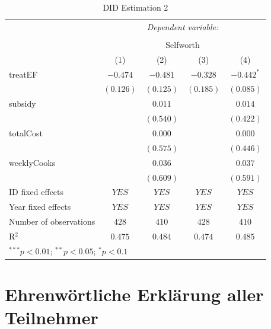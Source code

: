 \documentclass[12pt, a4paper, titlepage]{article}\usepackage[]{graphicx}\usepackage[]{color}
\begin{document}
\begin{table}
\begin{center}
\begin{tabular}{l c c c c}
& \multicolumn{4}{c}{\textit{Dependent variable:}} \\
\cline{2-5}
\\[-1.8ex] & \multicolumn{4}{c}{Selfworth} \\
\hline
 & (1) & (2) & (3) & (4) \\
\hline
treatEF                & $-0.474$  & $-0.481$  & $-0.328$  & $-0.442^{*}$ \\
                       & $(0.126)$ & $(0.125)$ & $(0.185)$ & $(0.085)$    \\
subsidy                &           & $0.011$   &           & $0.014$      \\
                       &           & $(0.540)$ &           & $(0.422)$    \\
totalCost              &           & $0.000$   &           & $0.000$      \\
                       &           & $(0.575)$ &           & $(0.446)$    \\
weeklyCooks            &           & $0.036$   &           & $0.037$      \\
                       &           & $(0.609)$ &           & $(0.591)$    \\
\hline
ID fixed effects       & $YES$     & $YES$     & $YES$     & $YES$        \\
Year fixed effects     & $YES$     & $YES$     & $YES$     & $YES$        \\
Number of observations & $428$     & $410$     & $428$     & $410$        \\
R$^2$                  & $0.475$   & $0.484$   & $0.474$   & $0.485$      \\
\hline
\multicolumn{5}{l}{\scriptsize{$^{***}p<0.01$; $^{**}p<0.05$; $^{*}p<0.1$}}
\end{tabular}
\caption{DID Estimation 2}
\label{table:coefficients4}
\end{center}
\end{table}



\section{Ehrenwörtliche Erklärung aller Teilnehmer}
\end{document}
